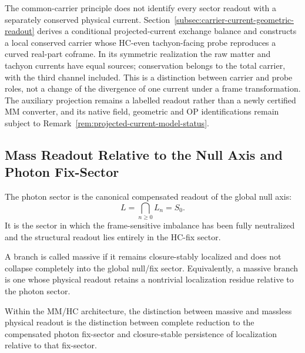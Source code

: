 \begin{remark}
The common-carrier principle does not identify every sector readout
with a separately conserved physical current.
Section~\ref{subsec:carrier-current-geometric-readout} derives a
conditional projected-current exchange balance and constructs a
local conserved carrier whose HC-even tachyon-facing probe reproduces
a curved real-part coframe. In its symmetric realization the raw
matter and tachyon currents have equal sources; conservation belongs
to the total carrier, with the third channel included. This is a
distinction between carrier and probe roles, not a change of the
divergence of one current under a frame transformation. The auxiliary
projection remains a labelled readout rather than a newly certified
MM converter, and its native field, geometric and OP identifications
remain subject to Remark~\ref{rem:projected-current-model-status}.
\end{remark}

\subsection{Mass Readout Relative to the Null Axis and Photon Fix-Sector}
\label{subsec:mass-null-axis}

\begin{definition}
The photon sector is the canonical compensated readout of the global null
axis:
\[
L=\bigcap_{n\ge 0} L_n = S_0.
\]
It is the sector in which the frame-sensitive imbalance has been fully
neutralized and the structural readout lies entirely in the HC-fix sector.
\end{definition}

\begin{definition}
A branch is called massive if it remains closure-stably localized and does not
collapse completely into the global null/fix sector. Equivalently, a massive
branch is one whose physical readout retains a nontrivial localization residue
relative to the photon sector.
\end{definition}

\begin{theorem}
\label{thm:massive-vs-massless}
Within the MM/HC architecture, the distinction between massive and massless
physical readout is the distinction between complete reduction to the
compensated photon fix-sector and closure-stable persistence of localization
relative to that fix-sector.
\end{theorem}

